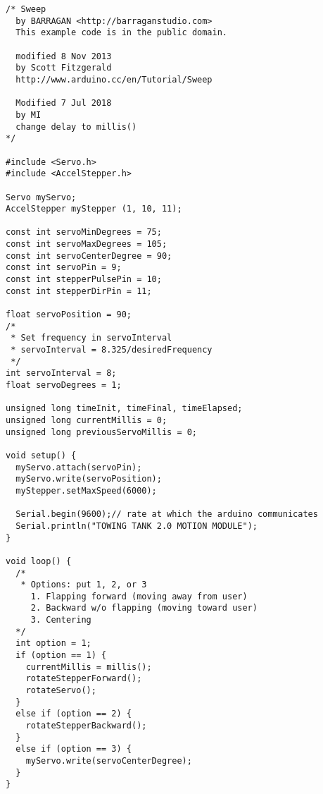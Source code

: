 \begin{lstlisting}[caption={Code for traversing module in Arduino}]
  /* Sweep
  by BARRAGAN <http://barraganstudio.com>
  This example code is in the public domain.

  modified 8 Nov 2013
  by Scott Fitzgerald
  http://www.arduino.cc/en/Tutorial/Sweep

  Modified 7 Jul 2018
  by MI
  change delay to millis()
*/

#include <Servo.h>
#include <AccelStepper.h>

Servo myServo;
AccelStepper myStepper (1, 10, 11);

const int servoMinDegrees = 75;
const int servoMaxDegrees = 105;
const int servoCenterDegree = 90;
const int servoPin = 9;
const int stepperPulsePin = 10;
const int stepperDirPin = 11;

float servoPosition = 90;
/*
 * Set frequency in servoInterval
 * servoInterval = 8.325/desiredFrequency
 */
int servoInterval = 8;
float servoDegrees = 1;

unsigned long timeInit, timeFinal, timeElapsed;
unsigned long currentMillis = 0;
unsigned long previousServoMillis = 0;

void setup() {
  myServo.attach(servoPin);
  myServo.write(servoPosition);
  myStepper.setMaxSpeed(6000);

  Serial.begin(9600);// rate at which the arduino communicates
  Serial.println("TOWING TANK 2.0 MOTION MODULE");
}

void loop() {
  /*
   * Options: put 1, 2, or 3
     1. Flapping forward (moving away from user)
     2. Backward w/o flapping (moving toward user)
     3. Centering
  */
  int option = 1;
  if (option == 1) {
    currentMillis = millis();
    rotateStepperForward();
    rotateServo();
  }
  else if (option == 2) {
    rotateStepperBackward();
  }
  else if (option == 3) {
    myServo.write(servoCenterDegree);
  }
}


\end{lstlisting}
